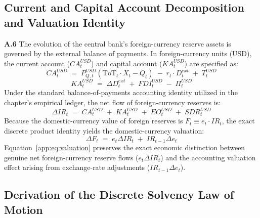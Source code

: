 \subsection{Current and Capital Account Decomposition and Valuation Identity}
\label{app:current_account}

\textbf{A.6} The evolution of the central bank's foreign-currency reserve assets is governed by the external balance of payments. In foreign-currency units (USD), the current account ($CA_t^{USD}$) and capital account ($KA_t^{USD}$) are specified as:
\begin{equation}
	\label{app:eq:CA}
	CA_t^{USD} \;=\; P_{Q,t}^{USD}\!\left(\text{ToT}_t \cdot X_t - Q_t\right) \;-\; r_t \cdot D_t^{ext} \;+\; T_t^{USD}
\end{equation}
\begin{equation}
	\label{app:eq:KA}
	KA_t^{USD} \;=\; \Delta D_t^{ext} \;+\; FDI_t^{USD} \;-\; \Pi_t^{USD}
\end{equation}
Under the standard balance-of-payments accounting identity utilized in the chapter's empirical ledger, the net flow of foreign-currency reserves is:
\begin{equation}
	\label{app:eq:bop_flow}
	\Delta IR_t \;=\; CA_t^{USD} \;+\; KA_t^{USD} \;+\; EO_t^{USD} \;+\; SDR_t^{USD}
\end{equation}
Because the domestic-currency value of foreign reserves is $F_t \equiv e_t \cdot IR_t$, the exact discrete product identity yields the domestic-currency valuation:
\begin{equation}
	\label{app:eq:valuation}
	\Delta F_t \;=\; e_t \Delta IR_t \;+\; IR_{t-1} \Delta e_t
\end{equation}
Equation~\eqref{app:eq:valuation} preserves the exact economic distinction between genuine net foreign-currency reserve flows ($e_t \Delta IR_t$) and the accounting valuation effect arising from exchange-rate adjustments ($IR_{t-1} \Delta e_t$).

\subsection{Derivation of the Discrete Solvency Law of Motion}
\label{app:solvr_substitution}

